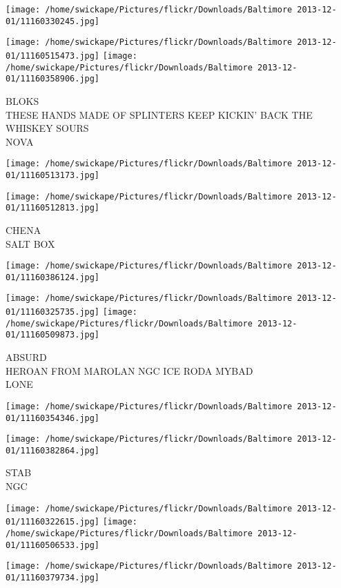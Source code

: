 \documentclass[10pt,letterpaper]{article}
\begin{document}
\texttt{[image: /home/swickape/Pictures/flickr/Downloads/Baltimore 2013-12-01/11160330245.jpg]}

\vspace{0.25in}
\texttt{[image: /home/swickape/Pictures/flickr/Downloads/Baltimore 2013-12-01/11160515473.jpg]}
\texttt{[image: /home/swickape/Pictures/flickr/Downloads/Baltimore 2013-12-01/11160358906.jpg]}

BLOKS\\
THESE HANDS MADE OF SPLINTERS KEEP KICKIN' BACK THE WHISKEY SOURS\\
NOVA
\pagebreak

\texttt{[image: /home/swickape/Pictures/flickr/Downloads/Baltimore 2013-12-01/11160513173.jpg]}

\vspace{0.25in}
\texttt{[image: /home/swickape/Pictures/flickr/Downloads/Baltimore 2013-12-01/11160512813.jpg]}

CHENA\\
SALT BOX
\pagebreak

\texttt{[image: /home/swickape/Pictures/flickr/Downloads/Baltimore 2013-12-01/11160386124.jpg]}

\vspace{0.25in}
\texttt{[image: /home/swickape/Pictures/flickr/Downloads/Baltimore 2013-12-01/11160325735.jpg]}
\texttt{[image: /home/swickape/Pictures/flickr/Downloads/Baltimore 2013-12-01/11160509873.jpg]}

ABSURD\\
HEROAN FROM MAROLAN NGC ICE RODA MYBAD\\
LONE
\pagebreak

\texttt{[image: /home/swickape/Pictures/flickr/Downloads/Baltimore 2013-12-01/11160354346.jpg]}

\vspace{0.25in}
\texttt{[image: /home/swickape/Pictures/flickr/Downloads/Baltimore 2013-12-01/11160382864.jpg]}

STAB\\
NGC
\pagebreak

\texttt{[image: /home/swickape/Pictures/flickr/Downloads/Baltimore 2013-12-01/11160322615.jpg]}
\texttt{[image: /home/swickape/Pictures/flickr/Downloads/Baltimore 2013-12-01/11160506533.jpg]}

\texttt{[image: /home/swickape/Pictures/flickr/Downloads/Baltimore 2013-12-01/11160379734.jpg]}
\end{document}
